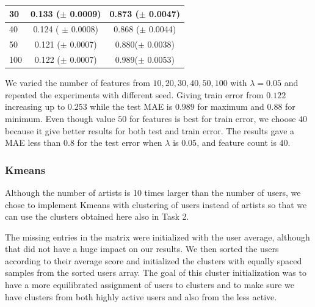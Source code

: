 \begin{minipage}{\textwidth}
\begin{minipage}[b]{0.5\textwidth}
\begin{center}
\begin{tabular}{ |l | c | c| }
     30     & 0.133 ($\pm$ 0.0009)  & 0.873 ($\pm$ 0.0047) \\ \hline
     40    & 0.124  ( $\pm$ 0.0008) & 0.868 ($\pm$  0.0044)\\ \hline
     50       & 0.121 ($\pm$ 0.0007) & 0.880($\pm$  0.0038)\\ \hline
     100    & 0.122 ($\pm$ 0.0007) & 0.989($\pm$  0.0053) \\
    \hline
  \end{tabular}
  	\label{table:feature_choice}
\end{center}
\vspace{10 mm}
    \end{minipage}
  \end{minipage}
  
We varied the number of features from $10,20,30,40,50,100$ with $\lambda = 0.05$ and repeated the experiments with different seed. Giving train error from $0.122$ increasing up to $0.253$ while the test MAE is $0.989$ for maximum and $0.88$ for minimum. Even though value $50$ for features is best for train error, we choose $40$ because it give better results for both test and train error. The results gave a MAE less than $0.8$ for the test error when $\lambda$ is $0.05$, and feature count is $40$.


\subsubsection{Kmeans}
Although the number of artists is 10 times larger than the number of users,
we chose to implement Kmeans with clustering of users 
instead of artists so that we can use the clusters obtained here also in Task 2.

The missing entries in the matrix were initialized with the user average, although that did not have a huge impact on our results. We then sorted the users according to their average score and initialized the clusters with equally spaced samples from the sorted users array. The goal of this cluster initialization was to have a more equilibrated assignment of users to clusters and to make sure we have clusters from both highly active users and also from the less active.

